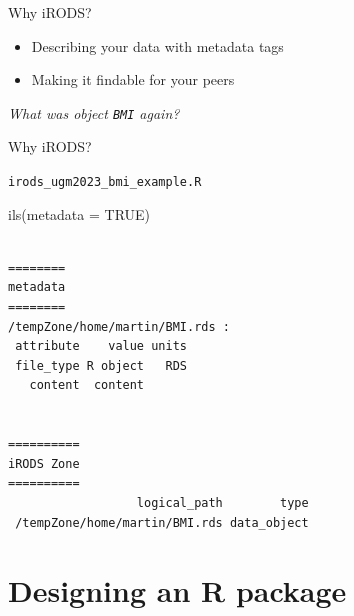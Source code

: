 \documentclass[
  ignorenonframetext,
]{beamer}
\newenvironment{Shaded}{\begin{snugshade}}{\end{snugshade}}
\newcommand{\AttributeTok}[1]{\textcolor[rgb]{0.40,0.45,0.13}{#1}}
\newcommand{\ConstantTok}[1]{\textcolor[rgb]{0.56,0.35,0.01}{#1}}
\newcommand{\FunctionTok}[1]{\textcolor[rgb]{0.28,0.35,0.67}{#1}}
\newcommand{\NormalTok}[1]{\textcolor[rgb]{0.00,0.23,0.31}{#1}}
\providecommand{\tightlist}{%
  \setlength{\itemsep}{0pt}\setlength{\parskip}{0pt}}\usepackage{longtable,booktabs,array}
\begin{document}
\begin{frame}[fragile]{Why iRODS?}
\protect\hypertarget{why-irods-1}{}
\begin{itemize}
\tightlist
\item
  Describing your data with metadata tags
\item
  Making it findable for your peers
\end{itemize}

\emph{What was object \texttt{BMI} again?}
\end{frame}

\begin{frame}[fragile]{Why iRODS?}
\protect\hypertarget{why-irods-2}{}
\begin{codelisting}

\caption{\texttt{irods_ugm2023_bmi_example.R}}

\begin{Shaded}
\begin{Highlighting}[]
\FunctionTok{ils}\NormalTok{(}\AttributeTok{metadata =} \ConstantTok{TRUE}\NormalTok{)}
\end{Highlighting}
\end{Shaded}

\end{codelisting}

\begin{verbatim}

========
metadata
========
/tempZone/home/martin/BMI.rds :
 attribute    value units
 file_type R object   RDS
   content  content      


==========
iRODS Zone
==========
                  logical_path        type
 /tempZone/home/martin/BMI.rds data_object
\end{verbatim}
\end{frame}

\hypertarget{designing-an-r-package}{%
\section{Designing an R package}\label{designing-an-r-package}}
\end{document}
